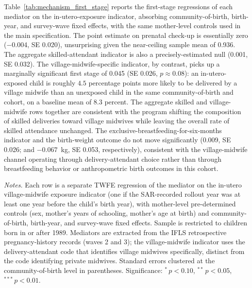 Table~\ref{tab:mechanism_first_stage} reports the first-stage regressions of each mediator on the in-utero-exposure indicator, absorbing community-of-birth, birth-year, and survey-wave fixed effects, with the same mother-level controls used in the main specification. The point estimate on prenatal check-up is essentially zero (\num{-0.004}, SE \num{0.020}), unsurprising given the near-ceiling sample mean of \num{0.936}. The aggregate skilled-attendant indicator is also a precisely-estimated null (\num{0.001}, SE \num{0.032}). The village-midwife-specific indicator, by contrast, picks up a marginally significant first stage of \num{0.045} (SE \num{0.026}, $p \approx 0.08$): an in-utero-exposed child is roughly $4.5$ percentage points more likely to be delivered by a village midwife than an unexposed child in the same community-of-birth and cohort, on a baseline mean of $8.3$ percent. The aggregate skilled and village-midwife rows together are consistent with the program shifting the composition of skilled deliveries toward village midwives while leaving the overall rate of skilled attendance unchanged. The exclusive-breastfeeding-for-six-months indicator and the birth-weight outcome do not move significantly (\num{0.009}, SE \num{0.026}; and $-\num{0.067}$~kg, SE \num{0.053}, respectively), consistent with the village-midwife channel operating through delivery-attendant choice rather than through breastfeeding behavior or anthropometric birth outcomes in this cohort.

\begin{table}[!htbp] \centering \caption{First-stage: effect of in-utero village-midwife exposure on candidate mediators.} \label{tab:mechanism_first_stage}  \begin{minipage}{0.95\textwidth} \footnotesize \emph{Notes.} Each row is a separate TWFE regression of the mediator on the in-utero village-midwife exposure indicator (one if the SAR-recorded rollout year was at least one year before the child's birth year), with mother-level pre-determined controls (sex, mother's years of schooling, mother's age at birth) and community-of-birth, birth-year, and survey-wave fixed effects. Sample is restricted to children born in or after 1989. Mediators are extracted from the IFLS retrospective pregnancy-history records (waves 2 and 3); the village-midwife indicator uses the delivery-attendant code that identifies village midwives specifically, distinct from the code identifying private midwives. Standard errors clustered at the community-of-birth level in parentheses. Significance: $^{*}\,p<0.10$, $^{**}\,p<0.05$, $^{***}\,p<0.01$. \end{minipage} \end{table}

